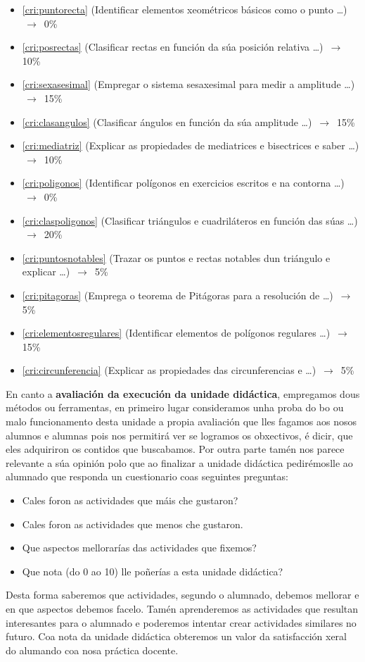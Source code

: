 \begin{itemize}
    \item \ref{cri:puntorecta}         (Identificar elementos xeométricos básicos como o punto \dots) $\,\to\,$ 0\%
    \item \ref{cri:posrectas}          (Clasificar rectas en función da súa posición relativa \dots) $\,\to\,$ 10\%
    \item \ref{cri:sexasesimal}        (Empregar o sistema sesaxesimal para medir a amplitude \dots) $\,\to\,$ 15\%
    \item \ref{cri:clasangulos}        (Clasificar ángulos en función da súa amplitude \dots) $\,\to\,$ 15\%
    \item \ref{cri:mediatriz}          (Explicar as propiedades de mediatrices e bisectrices e saber \dots) $\,\to\,$ 10\%
    \item \ref{cri:poligonos}          (Identificar polígonos en exercicios escritos e na contorna \dots) $\,\to\,$ 0\%
    \item \ref{cri:claspoligonos}      (Clasificar triángulos e cuadriláteros en función das súas  \dots) $\,\to\,$ 20\%
    \item \ref{cri:puntosnotables}     (Trazar os puntos e rectas notables dun triángulo e explicar  \dots) $\,\to\,$ 5\%
    \item \ref{cri:pitagoras}          (Emprega o teorema de Pitágoras para a resolución de   \dots) $\,\to\,$ 5\%
    \item \ref{cri:elementosregulares} (Identificar elementos de polígonos regulares  \dots) $\,\to\,$ 15\%
    \item \ref{cri:circunferencia}     (Explicar as propiedades das circunferencias e  \dots) $\,\to\,$ 5\%
\end{itemize}

En canto a \textbf{avaliación da execución da unidade didáctica}, empregamos dous métodos ou ferramentas, en primeiro lugar consideramos unha proba do bo ou malo funcionamento desta unidade a propia avaliación que lles fagamos aos nosos alumnos e alumnas pois nos permitirá ver se logramos os obxectivos, é dicir, que eles adquiriron os contidos que buscabamos. Por outra parte tamén nos parece relevante a súa opinión polo que ao finalizar a unidade didáctica pedirémoslle ao alumnado que responda un cuestionario coas seguintes preguntas:

\begin{itemize}
    \item Cales foron  as actividades que máis che gustaron?
    \item Cales foron as actividades que menos che gustaron.
    \item Que aspectos mellorarías das actividades que fixemos?
    \item Que nota (do 0 ao 10) lle poñerías a esta unidade didáctica?
\end{itemize}

Desta forma saberemos que actividades, segundo o alumnado, debemos mellorar e en que aspectos debemos facelo. Tamén aprenderemos as actividades que resultan interesantes para o alumnado e poderemos intentar crear actividades similares no futuro. Coa nota da unidade didáctica obteremos un valor da satisfacción xeral do alumando coa nosa práctica docente.
